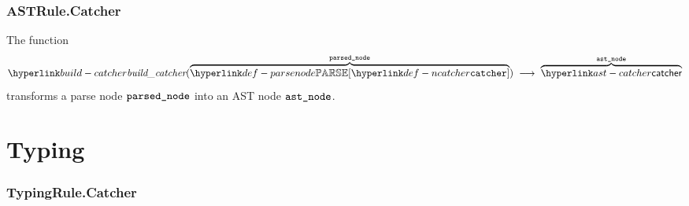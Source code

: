 \subsubsection{ASTRule.Catcher\label{sec:ASTRule.Catcher}}
\hypertarget{build-catcher}{}
The function
\[
\buildcatcher(\overname{\parsenode{\Ncatcher}}{\vparsednode}) \;\aslto\; \overname{\catcher}{\vastnode}
\]
transforms a parse node $\vparsednode$ into an AST node $\vastnode$.

\begin{mathpar}
\end{mathpar}

\begin{mathpar}
\end{mathpar}

\section{Typing}
\subsubsection{TypingRule.Catcher\label{sec:TypingRule.Catcher}}
